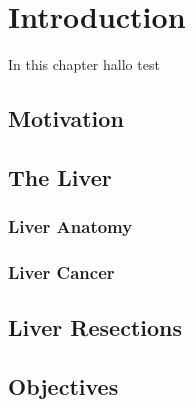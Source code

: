 %
%
%

\chapter{Introduction}
In this chapter 
hallo test

\section{Motivation} 
\section{The Liver} 
\subsection{Liver Anatomy}
\subsection{Liver Cancer}
\section{Liver Resections} 
\section{Objectives} 

\endinput
